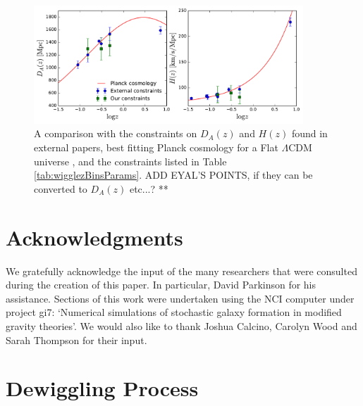 \documentclass[iop,twocolappendix]{emulateapj}
\newcommand{\red}{\color{red}}
\begin{document}
\begin{figure}[t]
	\begin{center}
		\includegraphics[width=0.9\textwidth]{images/external.pdf}
	\end{center}
	\caption{A comparison with the constraints on $D_A(z)$ and $H(z)$ found in external papers, best fitting Planck cosmology for a Flat $\Lambda$CDM universe \citep{Planck2015Parameters}, and the constraints listed in Table \ref{tab:wigglezBinsParams}.  {\red ADD EYAL'S POINTS, if they can be converted to $D_A(z)$ etc...? **} }
	\label{fig:external}
\end{figure}






\section*{Acknowledgments}

We gratefully acknowledge the input of the many researchers that were consulted during the creation of this paper. In particular, David Parkinson for his assistance. Sections of this work were undertaken using the NCI computer under project gi7: `Numerical simulations of stochastic galaxy formation in modified gravity theories'.   We  would also like to thank Joshua Calcino, Carolyn Wood and Sarah Thompson for their input.






\clearpage
\newpage
\phantom{df}
\pagebreak
\phantom{df}
\pagebreak
\appendix

	
	\section{Dewiggling Process} \label{app:dewiggle}
	
\end{document}
